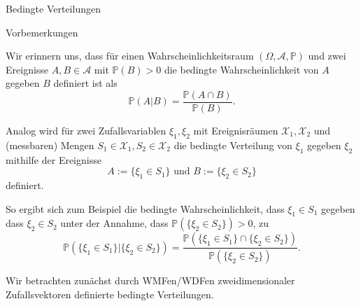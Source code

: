 \documentclass[
  8pt,
  ignorenonframetext,
]{beamer}
\begin{document}
\begin{frame}{Bedingte Verteilungen}
\protect\hypertarget{bedingte-verteilungen}{}
\small

Vorbemerkungen

\footnotesize

Wir erinnern uns, dass für einen Wahrscheinlichkeitsraum
\((\Omega, \mathcal{A}, \mathbb{P})\) und zwei Ereignisse
\(A,B \in \mathcal{A}\) mit \(\mathbb{P}(B) > 0\) die bedingte
Wahrscheinlichkeit von \(A\) gegeben \(B\) definiert ist als
\begin{equation}
\mathbb{P}(A|B) = \frac{\mathbb{P}(A \cap B)}{\mathbb{P}(B)}.
\end{equation}

Analog wird für zwei Zufallsvariablen \(\xi_1,\xi_2\) mit Ereignisräumen
\(\mathcal{X}_1,\mathcal{X}_2\) und (messbaren) Mengen
\(S_1 \in \mathcal{X}_1, S_2 \in \mathcal{X}_2\) die bedingte Verteilung
von \(\xi_1\) gegeben \(\xi_2\) mithilfe der Ereignisse \begin{equation}
A := \{\xi_1 \in S_1\} \mbox{ und } B := \{\xi_2 \in S_2\}
\end{equation} definiert. \vspace{1mm}

So ergibt sich zum Beispiel die bedingte Wahrscheinlichkeit, dass
\(\xi_1 \in S_1\) gegeben dass \(\xi_2 \in S_2\) unter der Annahme, dass
\(\mathbb{P}(\{\xi_2 \in S_2\}) > 0\), zu \begin{equation}
\mathbb{P}( \{\xi_1 \in S_1\}|\{\xi_2 \in S_2\})
= \frac{\mathbb{P}(\{\xi_1 \in S_1\} \cap \{\xi_2 \in S_2\})}{\mathbb{P}(\{\xi_2 \in S_2\})}.
\end{equation}

Wir betrachten zunächst durch WMFen/WDFen zweidimensionaler
Zufallsvektoren definierte bedingte Verteilungen.
\end{frame}
\end{document}
